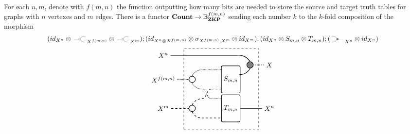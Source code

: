\documentclass[preliminary,copyright,creativecommons,sharealike,noncommercial]{eptcs}
\begin{document}
\begin{theorem}\label{thm: bzkp functor}
  For each $n,m$, denote with $f(m,n)$ the function outputting how many
  bits are needed to store the source and target truth tables for graphs 
  with $n$ vertexes and $m$ edges. There is a functor $\textbf{Count} \to \mathbb{B}^{f(m,n)}_\textbf{ZKP}$ sending each 
  number $k$ to the $k$-fold composition of the morphism
  \begin{equation*}
    (\Id{X^n} \Tensor \COPYSym_{X^{f(m,n)}} \Tensor \COPYSym_{X^m});
    (\Id{X^n \Tensor X^{f(m,n)}} \Tensor \sigma_{X^{f(m,n)},X^m} \Tensor \Id{X^m});
    (\Id{X^n} \Tensor S_{m,n} \Tensor T_{m,n});(\MATCHSym_{X^n} \Tensor \Id{X^n})
  \end{equation*}
  \begin{equation*}
    \begin{tikzpicture}
      \node[draw, circle, radius=5pt, thick] (copy2) at (-2,1.75) {};
      \node[draw, circle, radius=5pt, thick] (copy) at (-2,0.25) {};

      \node[draw, minimum height=40, minimum width=20, rounded corners=2, thick] (S) at (0,1.75) {$S_{m,n}$};
      \node[draw, minimum height=40, minimum width=20, rounded corners=2, thick] (T) at (0,0.25) {$T_{m,n}$};
      \node[draw, fill=gray, circle, radius=5pt, thick] (mat) at (1,2.5) {};

      \node[draw, dashed, minimum height=120, minimum width=110] (contour) at (-0.5,1.25) {};

      \node (Xv) at (-3.5,3) {$X^n$};
      \node (Xf) at (-3.5,1.75) {$X^{f(m,n)}$};
      \node (Xe) at (-3.5,0.25) {$X^m$};

      \node (X) at (2,2.5) {$X$};
      \node (Xv2) at (2,0.25) {$X^n$};

      \draw[-, thick] (Xv) to (10pt,3);
      \draw[-, densely dotted, thick] (Xf) to (copy2.west);
      \draw[-, dashed, thick] (Xe) to (copy.west);

      \draw[densely dotted, bend left, thick] (copy2.north) to (-1.5,2.25);
      \draw[densely dotted, bend right, thick] (copy2.south) to (-1.5, 1.25);
      \draw[dashed, bend left, thick] (copy.north) to (-1.5,0.75);
      \draw[dashed, bend right, thick] (copy.south) to (-1.5, -0.25);

      \draw[-, densely dotted, thick] (-1.5, 2.25) to (-0.47, 2.25);
      \draw[dashed, thick, out=0, in=180] (-1.5,0.75) to (-1, 1.25);
      \draw[densely dotted, thick, out=0, in=180] (-1.5,1.25) to (-1,0.75);
      \draw[-, dashed, thick] (-1.5, -0.25) to (-0.47,-0.25);

      \draw[-, dashed, thick] (-1, 1.25) to (-0.47, 1.25);
      \draw[-, densely dotted, thick] (-1, 0.75) to (-0.47,0.75);

      \draw[bend left, thick] (10pt,3) to (mat.north);
      \draw[bend right, thick] (0.45, 2) to (mat.south);

      \draw[dashed, -, thick] (Xe) to (copy.west);



      \draw[-, dotted, thick] (mat.east) -- (X);
      \draw[-, thick] (T.east) -- (Xv2.west);
    \end{tikzpicture}
  \end{equation*}
\end{theorem}
\end{document}
